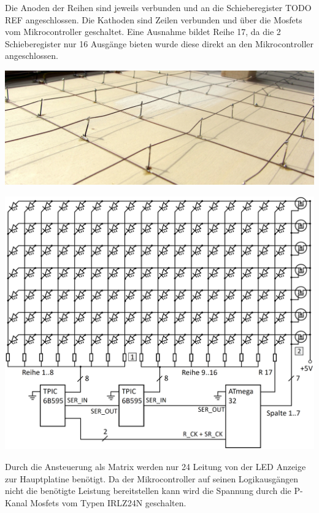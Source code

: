 Die Anoden der Reihen sind jeweils verbunden und an die Schieberegister TODO REF
angeschlossen. Die Kathoden sind Zeilen verbunden und über die Mosfets vom
Mikrocontroller geschaltet. Eine Ausnahme bildet Reihe 17, da die 2
Schieberegister nur 16 Ausgänge bieten wurde diese direkt an den Mikrocontroller
angeschlossen.
\begin{center}
	\includegraphics[width=\textwidth]{images/unterseite_drahtgitter.jpg} 
\end{center}
\label{led_matrix_verdrahtung}

\begin{center}
	\includegraphics[width=\textwidth]{skizzen/led_matrix_schaltplan.png} 
\end{center}
\label{led_matrix_schaltplan}

Durch die Ansteuerung als Matrix werden nur 24 Leitung von der LED Anzeige zur
Hauptplatine benötigt. Da der Mikrocontroller auf seinen Logikausgängen nicht
die benötigte Leistung bereitstellen kann wird die Spannung durch die P-Kanal
Mosfets vom Typen IRLZ24N geschalten.


